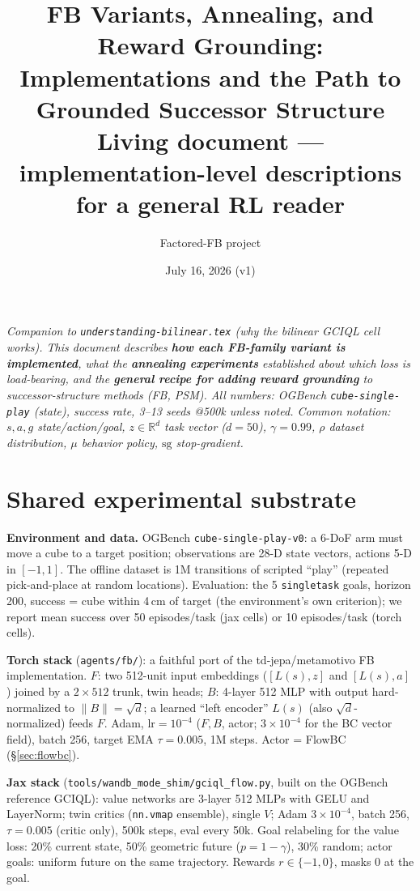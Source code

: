 \documentclass[11pt]{article}
\title{FB Variants, Annealing, and Reward Grounding:\\ Implementations and the Path to
Grounded Successor Structure\\
\large Living document --- implementation-level descriptions for a general RL reader}
\author{Factored-FB project}
\date{July 16, 2026 (v1)}
\newcommand{\sg}{\mathrm{sg}}
\newcommand{\R}{\mathbb{R}}
\begin{document}
\maketitle

\noindent\emph{Companion to \texttt{understanding-bilinear.tex} (why the bilinear GCIQL cell
works). This document describes \textbf{how each FB-family variant is implemented}, what the
\textbf{annealing experiments} established about which loss is load-bearing, and the
\textbf{general recipe for adding reward grounding} to successor-structure methods (FB, PSM).
All numbers: OGBench \texttt{cube-single-play} (state), success rate, 3--13 seeds @500k unless
noted. Common notation: $s,a,g$ state/action/goal, $z\in\R^d$ task vector ($d{=}50$),
$\gamma{=}0.99$, $\rho$ dataset distribution, $\mu$ behavior policy, $\sg$ stop-gradient.}

\tableofcontents

\section{Shared experimental substrate}\label{sec:substrate}

\textbf{Environment and data.} OGBench \texttt{cube-single-play-v0}: a 6-DoF arm must move a
cube to a target position; observations are 28-D state vectors, actions 5-D in $[-1,1]$. The
offline dataset is 1M transitions of scripted ``play'' (repeated pick-and-place at random
locations). Evaluation: the 5 \texttt{singletask} goals, horizon 200, success = cube within
4\,cm of target (the environment's own criterion); we report mean success over
50 episodes/task (jax cells) or 10 episodes/task (torch cells).

\textbf{Torch stack} (\texttt{agents/fb/}): a faithful port of the td-jepa/metamotivo FB
implementation. $F$: two 512-unit input embeddings ($[L(s),z]$ and $[L(s),a]$) joined by a
$2{\times}512$ trunk, twin heads; $B$: 4-layer 512 MLP with output hard-normalized to
$\|B\|=\sqrt d$; a learned ``left encoder'' $L(s)$ (also $\sqrt d$-normalized) feeds $F$.
Adam, $\mathrm{lr}=10^{-4}$ ($F,B$, actor; $3{\times}10^{-4}$ for the BC vector field), batch
256, target EMA $\tau=0.005$, 1M steps. Actor = FlowBC (\S\ref{sec:flowbc}).

\textbf{Jax stack} (\texttt{tools/wandb\_mode\_shim/gciql\_flow.py}, built on the OGBench
reference GCIQL): value networks are 3-layer 512 MLPs with GELU and LayerNorm; twin critics
(\texttt{nn.vmap} ensemble), single $V$; Adam $3{\times}10^{-4}$, batch 256, $\tau=0.005$
(critic only), 500k steps, eval every 50k. Goal relabeling for the value loss: 20\% current
state, 50\% geometric future ($p=1-\gamma$), 30\% random; actor goals: uniform future on the
same trajectory. Rewards $r\in\{-1,0\}$, masks 0 at the goal.
\end{document}
